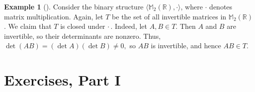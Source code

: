 \documentclass[10pt,]{book}
\theoremstyle{plain}
\theoremstyle{definition}
\theoremstyle{definition}
\theoremstyle{definition}
\newtheorem{example}[theorem]{Example}
\theoremstyle{definition}
\numberwithin{equation}{section}
\def\R{\mathbb{R}}
\def\M{\mathbb{M}}
\begin{document}
\begin{example}[]\label{closed2}
Consider the binary structure \(\langle \M_2(\R), \cdot\rangle\), where \(\cdot\) denotes matrix multiplication.  Again, let \(T\)  be the set of all invertible matrices in \(\M_2(\R)\). We claim that \(T\) is closed under \(\cdot\,\). Indeed, let \(A,B\in T\). Then \(A\) and \(B\) are invertible, so their determinants are nonzero. Thus, \(\det(AB)=(\det A)(\det B)\neq 0,\) so \(AB\) is invertible, and hence  \(AB\in T\).%
\end{example}
\typeout{************************************************}
\typeout{************************************************}
\section[{Exercises, Part I}]{Exercises, Part I}\label{exercises-2}
\end{document}
